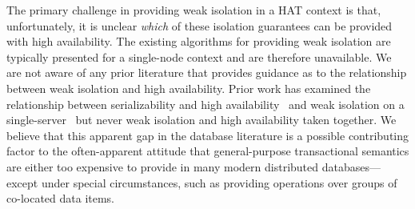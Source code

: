The primary challenge in providing weak isolation in a HAT context is
that, unfortunately, it is unclear \textit{which} of these isolation
guarantees can be provided with high availability. The existing
algorithms for providing weak isolation are typically presented for a
single-node context and are therefore unavailable. We are not aware of
any prior literature that provides guidance as to the relationship
between weak isolation and high availability. Prior work has examined
the relationship between serializability and high
availability~\cite{davidson-survey} and weak isolation on a
single-server~\cite{adya, ansicritique} but never weak isolation and
high availability taken together. We believe that this apparent gap in
the database literature is a possible contributing factor to the
often-apparent attitude that general-purpose transactional semantics
are either too expensive to provide in many modern distributed
databases---except under special circumstances, such as providing
operations over groups of co-located data items.
